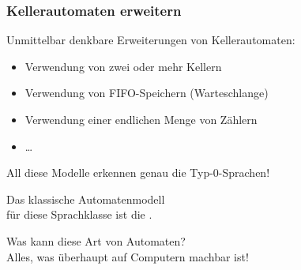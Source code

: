 \documentclass[aspectratio=1610,onlymath]{beamer}
\begin{document}
\begin{frame}\frametitle{Kellerautomaten erweitern}

Unmittelbar denkbare Erweiterungen von Kellerautomaten:
\begin{itemize}
\item Verwendung von zwei oder mehr Kellern
\item Verwendung von FIFO-Speichern (Warteschlange)
\item Verwendung einer endlichen Menge von Zählern
\item \ldots
\end{itemize}
\alert{All diese Modelle erkennen genau die Typ-0-Sprachen!}
\medskip\pause

Das klassische Automatenmodell\\für diese Sprachklasse ist die .%
%
\medskip\pause

Was kann diese Art von Automaten?\pause\\
Alles, was überhaupt auf Computern machbar ist!\medskip


\end{frame}
\end{document}
